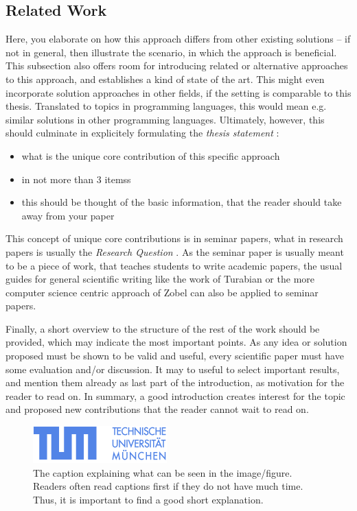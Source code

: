 \documentclass[twocolumn]{article}
\begin{document}
\subsection*{Related Work}

Here, you elaborate on how this approach differs from other existing solutions -- if not in general, then illustrate the scenario, in which the approach is beneficial. This subsection also offers room for introducing related or alternative approaches to this approach, and establishes a kind of state of the art. This might even incorporate solution approaches in other fields, if the setting is comparable to this thesis. Translated to topics in programming languages, this would mean e.g. similar solutions in other programming languages. Ultimately, however, this should culminate in explicitely formulating the \emph{thesis statement} \cite{thesis-statement}:
\begin{itemize}
\item what is the unique core contribution of this specific approach
\item in not more than 3 itemss
\item this should be thought of the basic information, that the reader
  should take away from your paper
\end{itemize}
This concept of unique core contributions is in seminar papers, what in
research papers is usually the \emph{Research Question} \cite{constructing-research-questions}. As the seminar paper is usually meant to be a piece of
work, that teaches students to write academic papers, the usual guides
for general scientific writing like the work of Turabian \cite{manual-for-writers} or the more computer science centric approach of Zobel
\cite{writing-for-computer-science} can also be applied to seminar papers.


Finally, a short overview to the structure of the rest of the work
should be provided, which may indicate the most important points.
As any idea or solution proposed must be shown to be valid and useful, every scientific paper
must have some evaluation and/or discussion. It may to useful to select
important results, and mention them already as last part of the
introduction, as motivation for the reader to read on. In summary,
a good introduction creates interest for the topic and
proposed new contributions that the reader cannot wait to read on.

\begin{figure}
\centerline{
\includegraphics[width=0.9\columnwidth,interpolate]{Figures/TUM-Logo-102.png}
}
\caption{The caption explaining what can be seen in the image/figure.
Readers often read captions first if they do not have much time. Thus,
it is important to find a good short explanation.}
\label{TUM}
\end{figure}
\end{document}
